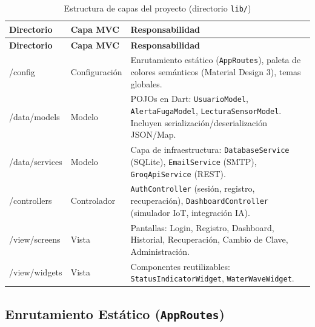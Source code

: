 \documentclass[12pt,a4paper]{article}
\begin{document}
\begin{longtable}{>{\ttfamily}p{3.5cm} p{3.5cm} p{7cm}}
\caption{Estructura de capas del proyecto (directorio \texttt{lib/})} \label{tab:arquitectura} \\
\toprule
\textbf{Directorio} & \textbf{Capa MVC} & \textbf{Responsabilidad} \\
\midrule
\endfirsthead
\toprule
\textbf{Directorio} & \textbf{Capa MVC} & \textbf{Responsabilidad} \\
\midrule
\endhead
\bottomrule
\endlastfoot
/config          & Configuración & Enrutamiento estático (\texttt{AppRoutes}), paleta de colores semánticos (Material Design 3), temas globales. \\[0.4em]
/data/models     & Modelo        & POJOs en Dart: \texttt{UsuarioModel}, \texttt{AlertaFugaModel}, \texttt{LecturaSensorModel}. Incluyen serialización/deserialización JSON/Map. \\[0.4em]
/data/services   & Modelo        & Capa de infraestructura: \texttt{DatabaseService} (SQLite), \texttt{EmailService} (SMTP), \texttt{GroqApiService} (REST). \\[0.4em]
/controllers     & Controlador   & \texttt{AuthController} (sesión, registro, recuperación), \texttt{DashboardController} (simulador IoT, integración IA). \\[0.4em]
/view/screens    & Vista         & Pantallas: Login, Registro, Dashboard, Historial, Recuperación, Cambio de Clave, Administración. \\[0.4em]
/view/widgets    & Vista         & Componentes reutilizables: \texttt{StatusIndicatorWidget}, \texttt{WaterWaveWidget}. \\
\end{longtable}

\subsection{Enrutamiento Estático (\texttt{AppRoutes})}
\end{document}
